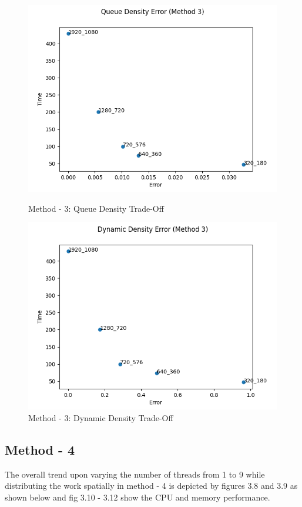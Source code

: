\documentclass[paper=a4, fontsize = 12pt]{scrartcl}
\numberwithin{equation}{section}		%
\numberwithin{figure}{section}			%
\numberwithin{table}{section}				%
\begin{document}
\begin{figure}[H]
    \centering
    \captionsetup{justification=centering,margin=2cm}
    \includegraphics[width = 15cm]{method3_tradeoff_queue.png}
    \caption{Method - 3: Queue Density Trade-Off}
    \label{fig:M2QueueTradeOff}
    
    \includegraphics[width = 15cm]{method3_tradeoff_dynamic.png}
    \caption{Method - 3: Dynamic Density Trade-Off}
    \label{fig:M3DynamicTradeOff}
\end{figure}






\subsection{Method - 4}
The overall trend upon varying the number of threads from 1 to 9 while distributing the work spatially in method - 4 is depicted by figures 3.8 and 3.9 as shown below and fig 3.10 - 3.12 show the CPU and memory performance.
\end{document}

